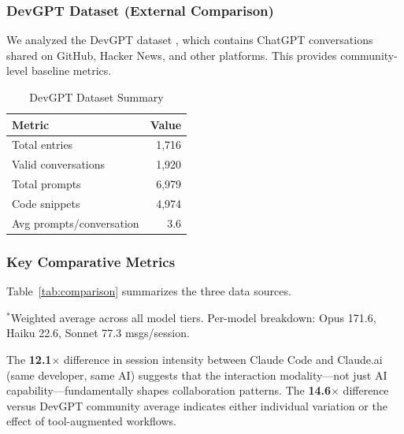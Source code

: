 \subsubsection{DevGPT Dataset (External Comparison)}

We analyzed the DevGPT dataset \cite{tao2024devgpt}, which contains ChatGPT conversations shared on GitHub, Hacker News, and other platforms. This provides community-level baseline metrics.

\begin{table}[h]
\caption{DevGPT Dataset Summary}
\label{tab:devgpt}
\begin{tabular}{lr}
\toprule
\textbf{Metric} & \textbf{Value} \\
\midrule
Total entries & 1,716 \\
Valid conversations & 1,920 \\
Total prompts & 6,979 \\
Code snippets & 4,974 \\
Avg prompts/conversation & 3.6 \\
\bottomrule
\end{tabular}
\end{table}

\subsubsection{Key Comparative Metrics}

Table~\ref{tab:comparison} summarizes the three data sources.

\begin{table}[h]
\caption{Cross-Source Comparison}
\label{tab:comparison}
\smallskip
\footnotesize{$^*$Weighted average across all model tiers. Per-model breakdown: Opus 171.6, Haiku 22.6, Sonnet 77.3 msgs/session.}
\end{table}

The \textbf{12.1$\times$} difference in session intensity between Claude Code and Claude.ai (same developer, same AI) suggests that the interaction modality---not just AI capability---fundamentally shapes collaboration patterns. The \textbf{14.6$\times$} difference versus DevGPT community average indicates either individual variation or the effect of tool-augmented workflows.

